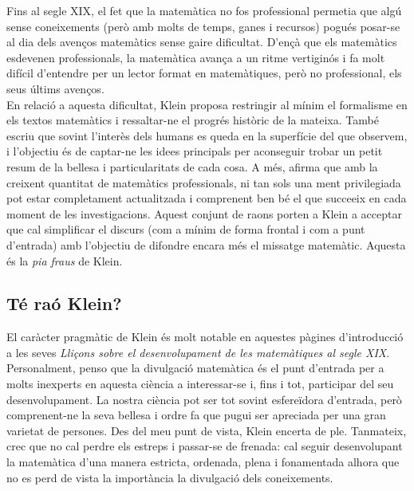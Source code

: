 \documentclass[a4paper, 11pt]{article}
\begin{document}
  Fins al segle XIX, el fet que la matemàtica no fos professional permetia que algú sense coneixements (però amb molts de
  temps, ganes i recursos) pogués posar-se al dia dels avenços matemàtics sense gaire dificultat. D'ençà que els
  matemàtics esdevenen professionals, la matemàtica avança a un ritme vertiginós i fa molt difícil d'entendre per un
  lector format en matemàtiques, però no professional, els seus últims avenços.\\
  En relació a aquesta dificultat, Klein proposa restringir al mínim el formalisme en els textos matemàtics i
  ressaltar-ne el progrés històric de la mateixa. També escriu que sovint l'interès dels humans es queda en la superfície
  del que observem, i l'objectiu és de captar-ne les idees principals per aconseguir trobar un petit resum de la bellesa
  i particularitats de cada cosa. A més, afirma que amb la creixent quantitat de matemàtics professionals, ni tan sols
  una ment privilegiada pot estar completament actualitzada i comprenent ben bé el que succeeix en cada moment de les
  investigacions. Aquest conjunt de raons porten a Klein a acceptar que cal simplificar el discurs (com a mínim de forma
  frontal i com a punt d'entrada) amb l'objectiu de difondre encara més el missatge matemàtic. Aquesta és la \textit{pia
    fraus} de Klein.

\subsection*{Té raó Klein?}
  El caràcter pragmàtic de Klein és molt notable en aquestes pàgines d'introducció a les seves \textit{Lliçons sobre el
    desenvolupament de les matemàtiques al segle XIX}. Personalment, penso que la divulgació matemàtica és el punt
  d'entrada per a molts inexperts en aquesta ciència a interessar-se i, fins i tot, participar del seu desenvolupament.
  La nostra ciència pot ser tot sovint esfereïdora d'entrada, però comprenent-ne la seva bellesa i ordre fa que pugui ser
  apreciada per una gran varietat de persones. Des del meu punt de vista, Klein encerta de ple. Tanmateix, crec que no
  cal perdre els estreps i passar-se de frenada: cal seguir desenvolupant la matemàtica d'una manera estricta, ordenada,
  plena i fonamentada alhora que no es perd de vista la importància la divulgació dels coneixements.
\end{document}
